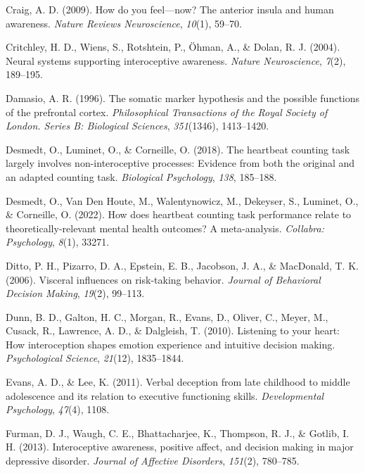 \documentclass[
  man,mask,floatsintext]{apa6}
\newlength{\cslhangindent}
\newenvironment{CSLReferences}[2] %
 {\begin{list}{}{%
  \setlength{\itemindent}{0pt}
  \setlength{\leftmargin}{0pt}
  \setlength{\parsep}{0pt}
  \ifodd #1
   \setlength{\leftmargin}{\cslhangindent}
   \setlength{\itemindent}{-1\cslhangindent}
  \fi
  \setlength{\itemsep}{#2\baselineskip}}}
 {\end{list}}
\begin{document}
\begin{CSLReferences}{1}{0}
Craig, A. D. (2009). How do you feel---now? The anterior insula and human awareness. \emph{Nature Reviews Neuroscience}, \emph{10}(1), 59--70.

Critchley, H. D., Wiens, S., Rotshtein, P., Öhman, A., \& Dolan, R. J. (2004). Neural systems supporting interoceptive awareness. \emph{Nature Neuroscience}, \emph{7}(2), 189--195.

Damasio, A. R. (1996). The somatic marker hypothesis and the possible functions of the prefrontal cortex. \emph{Philosophical Transactions of the Royal Society of London. Series B: Biological Sciences}, \emph{351}(1346), 1413--1420.

Desmedt, O., Luminet, O., \& Corneille, O. (2018). The heartbeat counting task largely involves non-interoceptive processes: Evidence from both the original and an adapted counting task. \emph{Biological Psychology}, \emph{138}, 185--188.

Desmedt, O., Van Den Houte, M., Walentynowicz, M., Dekeyser, S., Luminet, O., \& Corneille, O. (2022). How does heartbeat counting task performance relate to theoretically-relevant mental health outcomes? A meta-analysis. \emph{Collabra: Psychology}, \emph{8}(1), 33271.

Ditto, P. H., Pizarro, D. A., Epstein, E. B., Jacobson, J. A., \& MacDonald, T. K. (2006). Visceral influences on risk-taking behavior. \emph{Journal of Behavioral Decision Making}, \emph{19}(2), 99--113.

Dunn, B. D., Galton, H. C., Morgan, R., Evans, D., Oliver, C., Meyer, M., Cusack, R., Lawrence, A. D., \& Dalgleish, T. (2010). Listening to your heart: How interoception shapes emotion experience and intuitive decision making. \emph{Psychological Science}, \emph{21}(12), 1835--1844.

Evans, A. D., \& Lee, K. (2011). Verbal deception from late childhood to middle adolescence and its relation to executive functioning skills. \emph{Developmental Psychology}, \emph{47}(4), 1108.

Furman, D. J., Waugh, C. E., Bhattacharjee, K., Thompson, R. J., \& Gotlib, I. H. (2013). Interoceptive awareness, positive affect, and decision making in major depressive disorder. \emph{Journal of Affective Disorders}, \emph{151}(2), 780--785.


\end{CSLReferences}
\end{document}
